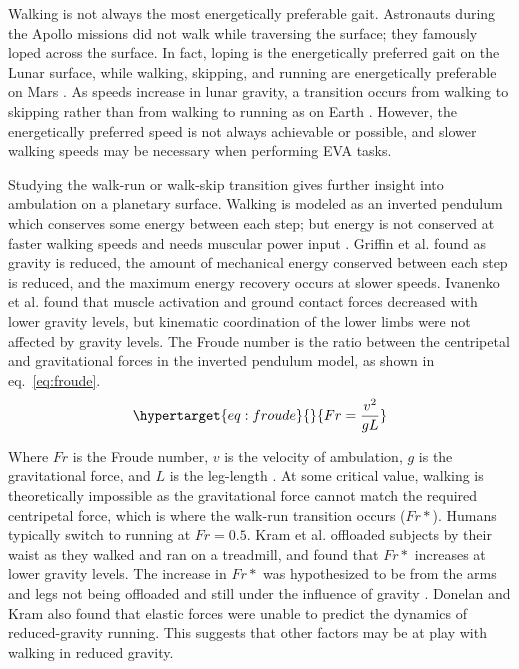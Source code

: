 \documentclass[defaultstyle,11pt]{thesis}
\begin{document}
Walking is not always the most energetically preferable gait.
Astronauts during the Apollo missions did not walk while traversing the surface; they famously loped across the surface.
In fact, loping is the energetically preferred gait on the Lunar surface, while walking, skipping, and running are energetically preferable on Mars \citep{Ackermann2012b}.
As speeds increase in lunar gravity, a transition occurs from walking to skipping rather than from walking to running as on Earth \citep{Minetti2012}.
However, the energetically preferred speed is not always achievable or possible, and slower walking speeds may be necessary when performing EVA tasks.

Studying the walk-run or walk-skip transition gives further insight into ambulation on a planetary surface.
Walking is modeled as an inverted pendulum which conserves some energy between each step; but energy is not conserved at faster walking speeds and needs muscular power input \citep{Cavagna1976, Cavagna1977}.
Griffin et al. \citep{Griffin1999} found as gravity is reduced, the amount of mechanical energy conserved between each step is reduced, and the maximum energy recovery occurs at slower speeds.
Ivanenko et al. \citep{Ivanenko2002} found that muscle activation and ground contact forces decreased with lower gravity levels, but kinematic coordination of the lower limbs were not affected by gravity levels.
The Froude number is the ratio between the centripetal and gravitational forces in the inverted pendulum model, as shown in eq.~\ref{eq:froude}.
\begin{equation}\protect\hypertarget{eq:froude}{}{
Fr=\frac{v^{2}}{gL}
}\label{eq:froude}\end{equation}

Where \(Fr\) is the Froude number, \(v\) is the velocity of ambulation, \(g\) is the gravitational force, and \(L\) is the leg-length \citep{AlexanderMcN.1989}.
At some critical value, walking is theoretically impossible as the gravitational force cannot match the required centripetal force, which is where the walk-run transition occurs (\(Fr*\)).
Humans typically switch to running at \(Fr=0.5\).
Kram et al. \citep{Kram1997} offloaded subjects by their waist as they walked and ran on a treadmill, and found that \(Fr*\) increases at lower gravity levels.
The increase in \(Fr*\) was hypothesized to be from the arms and legs not being offloaded and still under the influence of gravity \citep{Kram1997}.
Donelan and Kram \citep{Donelan2000} also found that elastic forces were unable to predict the dynamics of reduced-gravity running.
This suggests that other factors may be at play with walking in reduced gravity.
\end{document}

